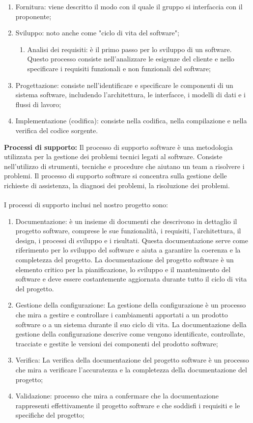 \begin{enumerate}
    \item Fornitura: viene descritto il modo con il quale il gruppo si interfaccia con il proponente;
    \item Sviluppo: noto anche come "ciclo di vita del software";
        \begin{enumerate}
            \item Analisi dei requisiti: è il primo passo per lo sviluppo di un software. Questo processo consiste nell'analizzare le esigenze del cliente e nello specificare i requisiti funzionali e non funzionali del software;
        \end{enumerate}
    \item Progettazione: consiste nell'identificare e specificare le componenti di un sistema software, includendo l'architettura, le interfacce, i modelli di dati e i flussi di lavoro;
    \item Implementazione (codifica): consiste nella codifica, nella compilazione e nella verifica del codice sorgente.
\end{enumerate}
\textbf{Processi di supporto:} 
Il processo di supporto software è una metodologia utilizzata per la gestione dei problemi tecnici legati al software. 
Consiste nell'utilizzo di strumenti, tecniche e procedure che aiutano un team a risolvere i problemi. 
Il processo di supporto software si concentra sulla gestione delle richieste di assistenza, la diagnosi dei problemi, la risoluzione dei problemi.
\\\\
I processi di supporto inclusi nel nostro progetto sono:
\begin{enumerate}
    \item Documentazione: è un insieme di documenti che descrivono in dettaglio il progetto software, comprese le sue funzionalità, i requisiti, l'architettura, il design, i processi di sviluppo e i risultati. 
    Questa documentazione serve come riferimento per lo sviluppo del software e aiuta a garantire la coerenza e la completezza del progetto. 
    La documentazione del progetto software è un elemento critico per la pianificazione, lo sviluppo e il mantenimento del software e deve essere costantemente aggiornata durante tutto il ciclo di vita del progetto.
    \item Gestione della configurazione: La gestione della configurazione è un processo che mira a gestire e controllare i cambiamenti apportati a un prodotto software o a un sistema durante il suo ciclo di vita. 
    La documentazione della gestione della configurazione descrive come vengono identificate, controllate, tracciate e gestite le versioni dei componenti del prodotto software;
    \item Verifica: La verifica della documentazione del progetto software è un processo che mira a verificare l'accuratezza e la completezza della documentazione del progetto;
    \item Validazione: processo che mira a confermare che la documentazione rappresenti effettivamente il progetto software e che soddisfi i requisiti e le specifiche del progetto;
\end{enumerate}
